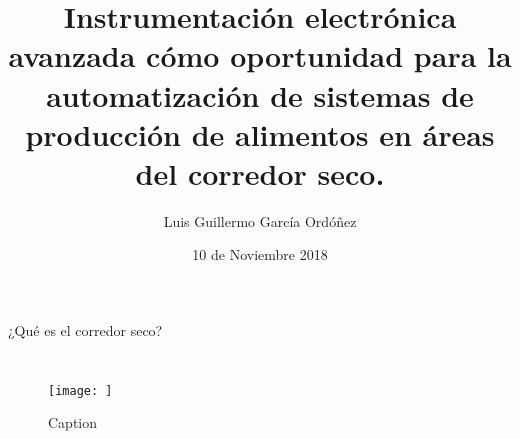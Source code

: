 \documentclass{beamer}
\title{Instrumentación electrónica avanzada cómo oportunidad para la automatización de sistemas de producción de alimentos en áreas del corredor seco.}
\author{Luis Guillermo García Ordóñez}
\date{10 de Noviembre 2018}
\begin{document}
\maketitle

\begin{frame}{¿Qué es el corredor seco?}
\begin{columns}
\begin{figure}
    \centering
    \texttt{[image: ]}
    \caption{Caption}
    \label{fig:my_label}
\end{figure}

\end{columns}

\end{frame}
\end{document}
